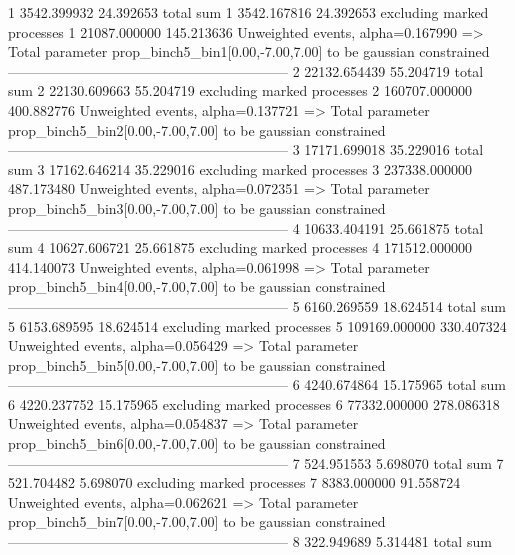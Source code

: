 1          3542.399932     24.392653       total sum                     
1          3542.167816     24.392653       excluding marked processes    
1          21087.000000    145.213636      Unweighted events, alpha=0.167990
  => Total parameter prop_binch5_bin1[0.00,-7.00,7.00] to be gaussian constrained
------------------------------------------------------------
2          22132.654439    55.204719       total sum                     
2          22130.609663    55.204719       excluding marked processes    
2          160707.000000   400.882776      Unweighted events, alpha=0.137721
  => Total parameter prop_binch5_bin2[0.00,-7.00,7.00] to be gaussian constrained
------------------------------------------------------------
3          17171.699018    35.229016       total sum                     
3          17162.646214    35.229016       excluding marked processes    
3          237338.000000   487.173480      Unweighted events, alpha=0.072351
  => Total parameter prop_binch5_bin3[0.00,-7.00,7.00] to be gaussian constrained
------------------------------------------------------------
4          10633.404191    25.661875       total sum                     
4          10627.606721    25.661875       excluding marked processes    
4          171512.000000   414.140073      Unweighted events, alpha=0.061998
  => Total parameter prop_binch5_bin4[0.00,-7.00,7.00] to be gaussian constrained
------------------------------------------------------------
5          6160.269559     18.624514       total sum                     
5          6153.689595     18.624514       excluding marked processes    
5          109169.000000   330.407324      Unweighted events, alpha=0.056429
  => Total parameter prop_binch5_bin5[0.00,-7.00,7.00] to be gaussian constrained
------------------------------------------------------------
6          4240.674864     15.175965       total sum                     
6          4220.237752     15.175965       excluding marked processes    
6          77332.000000    278.086318      Unweighted events, alpha=0.054837
  => Total parameter prop_binch5_bin6[0.00,-7.00,7.00] to be gaussian constrained
------------------------------------------------------------
7          524.951553      5.698070        total sum                     
7          521.704482      5.698070        excluding marked processes    
7          8383.000000     91.558724       Unweighted events, alpha=0.062621
  => Total parameter prop_binch5_bin7[0.00,-7.00,7.00] to be gaussian constrained
------------------------------------------------------------
8          322.949689      5.314481        total sum                     
